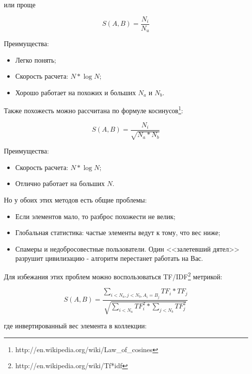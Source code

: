 или проще

\begin{equation}
 \label{eq:smlar2}
 S(A,B) = \frac{N_{i}}{N_{u}}
\end{equation}

Преимущества:

\begin{itemize}
  \item Легко понять;
  \item Скорость расчета: $N * \log{N}$;
  \item Хорошо работает на похожих и больших $N_a$ и $N_b$.
\end{itemize}

Также похожесть можно рассчитана по формуле косинусов\footnote{http://en.wikipedia.org/wiki/Law\_of\_cosines}:

\begin{equation}
 \label{eq:smlar3}
 S(A,B) = \frac{N_{i}}{\sqrt{N_{a}*N_{b}}}
\end{equation}

Преимущества:

\begin{itemize}
  \item Скорость расчета: $N * \log{N}$;
  \item Отлично работает на больших $N$.
\end{itemize}

Но у обоих этих методов есть общие проблемы:

\begin{itemize}
  \item Если элементов мало, то разброс похожести не велик;
  \item Глобальная статистика: частые элементы ведут к тому, что вес ниже;
  \item Спамеры и недобросовестные пользователи. Один <<залетевший дятел>> разрушит цивилизацию - алгоритм перестанет работать на Вас.
\end{itemize}

Для избежания этих проблем можно воспользоваться TF/IDF\footnote{http://en.wikipedia.org/wiki/Tf*idf} метрикой:

\begin{equation}
 \label{eq:smlar4}
 S(A,B) = \frac{\sum_{i < N_{a}, j < N_{b}, A_{i} = B_{j}}TF_{i} * TF_{j}}{\sqrt{\sum_{i < N_{a}}TF_{i}^{2} * \sum_{j < N_{b}}TF_{j}^{2}}}
\end{equation}

где инвертированный вес элемента в коллекции:

